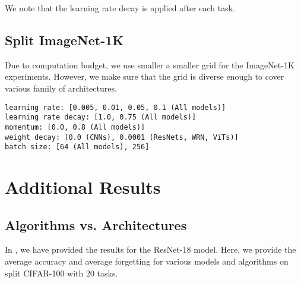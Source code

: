 We note that the learning rate decay is applied after each task.

\subsection{Split ImageNet-1K}
Due to computation budget, we use smaller a smaller grid for the ImageNet-1K experiments. However, we make sure that the grid is diverse enough to cover various family of architectures.
\begin{scriptsize}
\begin{verbatim}
learning rate: [0.005, 0.01, 0.05, 0.1 (All models)]
learning rate decay: [1.0, 0.75 (All models)]
momentum: [0.0, 0.8 (All models)]
weight decay: [0.0 (CNNs), 0.0001 (ResNets, WRN, ViTs)]
batch size: [64 (All models), 256]
\end{verbatim}
\end{scriptsize}



\section{Additional Results}
\label{sec:appendix-additional-results}

\subsection{Algorithms vs. Architectures}
In , we have provided the results for the ResNet-18 model. Here, we provide the average accuracy and average forgetting for various models and algorithms on split CIFAR-100 with 20 tasks.


\begin{table}[h!]
\centering
\caption{Different Algorithms and Architectures}
\label{tab:algorithms-vs-architectures}
\end{table}


